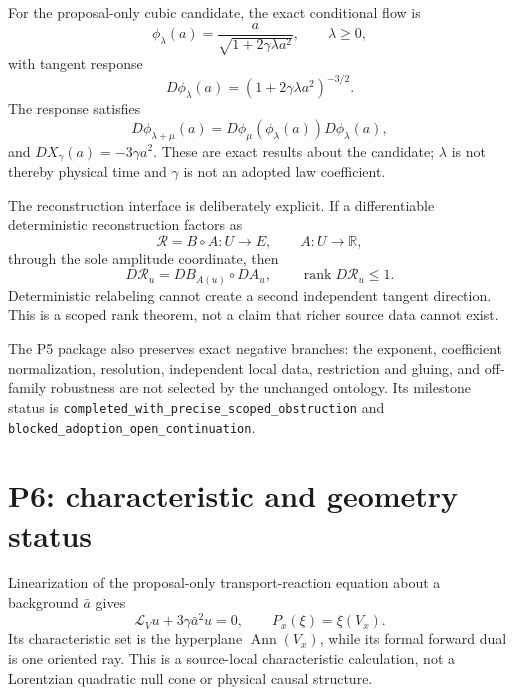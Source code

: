 \documentclass[11pt]{article}
\newcommand{\Ann}{\operatorname{Ann}}
\newcommand{\rank}{\operatorname{rank}}
\begin{document}
For the proposal-only cubic candidate, the exact conditional flow is
\[
  \phi_\lambda(a)
  =\frac{a}{\sqrt{1+2\gamma\lambda a^2}},
  \qquad \lambda\geq0,
\]
with tangent response
\[
  D\phi_\lambda(a)
  =(1+2\gamma\lambda a^2)^{-3/2}.
\]
The response satisfies
\[
  D\phi_{\lambda+\mu}(a)
  =D\phi_\mu(\phi_\lambda(a))D\phi_\lambda(a),
\]
and \(DX_\gamma(a)=-3\gamma a^2\).  These are exact results about the
candidate; \(\lambda\) is not thereby physical time and \(\gamma\) is not an
adopted law coefficient.

The reconstruction interface is deliberately explicit.  If a differentiable
deterministic reconstruction factors as
\[
   \mathcal R=B\circ A:U\longrightarrow E,
   \qquad A:U\to\mathbb R,
\]
through the sole amplitude coordinate, then
\[
   D\mathcal R_u=DB_{A(u)}\circ DA_u,
   \qquad \rank D\mathcal R_u\leq1.
\]
Deterministic relabeling cannot create a second independent tangent
direction.  This is a scoped rank theorem, not a claim that richer source
data cannot exist.

The P5 package also preserves exact negative branches: the exponent,
coefficient normalization, resolution, independent local data, restriction
and gluing, and off-family robustness are not selected by the unchanged
ontology.  Its milestone status is
\texttt{completed\_with\_precise\_scoped\_obstruction} and
\texttt{blocked\_adoption\_open\_continuation}.

\section{P6: characteristic and geometry status}

Linearization of the proposal-only transport-reaction equation about a
background \(\bar a\) gives
\[
  \mathcal L_Vu+3\gamma\bar a^2u=0,
  \qquad P_x(\xi)=\xi(V_x).
\]
Its characteristic set is the hyperplane \(\Ann(V_x)\), while its formal
forward dual is one oriented ray.  This is a source-local characteristic
calculation, not a Lorentzian quadratic null cone or physical causal
structure.
\end{document}
